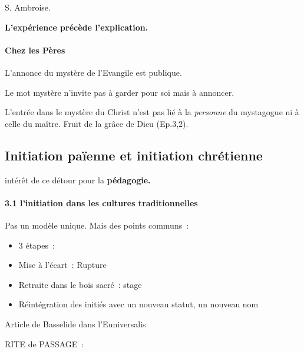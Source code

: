 S. Ambroise.

\textbf{L'expérience précède l'explication.}

\hypertarget{chez-les-puxe8res}{%
\paragraph{Chez les Pères}\label{chez-les-puxe8res}}

L'annonce du mystère de l'Evangile est publique.

Le mot mystère n'invite pas à garder pour soi mais à annoncer.

L'entrée dans le mystère du Christ n'est pas lié à la \emph{personne} du
mystagogue ni à celle du maître. Fruit de la grâce de Dieu (Ep.3,2).

\hypertarget{initiation-pauxefenne-et-initiation-chruxe9tienne}{%
\subsection{Initiation païenne et initiation
chrétienne}\label{initiation-pauxefenne-et-initiation-chruxe9tienne}}

intérêt de ce détour pour la \textbf{pédagogie.}

\hypertarget{linitiation-dans-les-cultures-traditionnelles}{%
\paragraph{3.1 l'initiation dans les cultures
traditionnelles}\label{linitiation-dans-les-cultures-traditionnelles}}

Pas un modèle unique. Mais des points communs~:

\begin{itemize}
\item
  3 étapes~:
\item
   
  Mise à l'écart~: Rupture
   
\item
   
  Retraite dans le bois sacré~: stage
   
\item
   
  Réintégration des initiés avec un nouveau statut, un nouveau nom
   
\end{itemize}

Article de Basselide dans l'Euniversalis

RITE de PASSAGE~:

